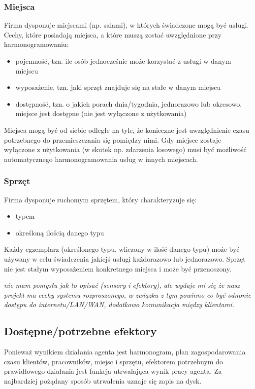 \subsubsection{Miejsca}\label{sssec:miejsca}
Firma dysponuje miejscami (np. salami), w których świadczone mogą być usługi. Cechy, które posiadają miejsca, a które muszą zostać uwzględnione przy harmonogramowaniu:
\begin{itemize}
	\item{pojemność, tzn. ile osób jednocześnie może korzystać z usługi w danym miejscu}
	\item{wyposażenie, tzn. jaki sprzęt znajduje się na stałe w danym miejscu}
	\item{dostępność, tzn. o jakich porach dnia/tygodnia, jednorazowo lub okresowo, miejsce jest dostępne (nie jest wyłączone z użytkowania)}
\end{itemize}
Miejsca mogą być od siebie odległe na tyle, że konieczne jest uwzględnienie czasu potrzebnego do przemieszczania się pomiędzy nimi.
Gdy miejsce zostaje wyłączone z użytkowania (w skutek np. zdarzenia losowego) musi być możliwość automatycznego harmonogramowania usług w innych miejscach.

\subsubsection{Sprzęt}\label{sssec:sprzet}
Firma dysponuje ruchomym sprzętem, który charakteryzuje się:
\begin{itemize}
	\item{typem}
	\item{określoną ilością danego typu}
\end{itemize}
Każdy egzemplarz (określonego typu, wliczony w ilość danego typu) może być używany w celu świadczenia jakiejś usługi każdorazowo lub jednorazowo.
Sprzęt nie jest stałym wyposażeniem konkretnego miejsca i może być przenoszony.


\emph{nie mam pomysłu jak to opisać (sensory i efektory), ale wydaje mi się że nasz projekt ma cechy systemu rozproszonego, w związku z tym powinno co być odnonie dostępu do internetu/LAN/WAN,
	 dodatkowo komunikacja między klientami.}

\subsection{Dostępne/potrzebne efektory}
Ponieważ wynikiem działania agenta jest harmonogram, plan zagospodarowania czasu klientów, pracowników, miejsc i sprzętu, efektorem potrzebnym do prawidłowego działania jest funkcja utrwalająca wynik pracy agenta. Za najbardziej pożądany sposób utrwalenia uznaje się zapis na dysk.

